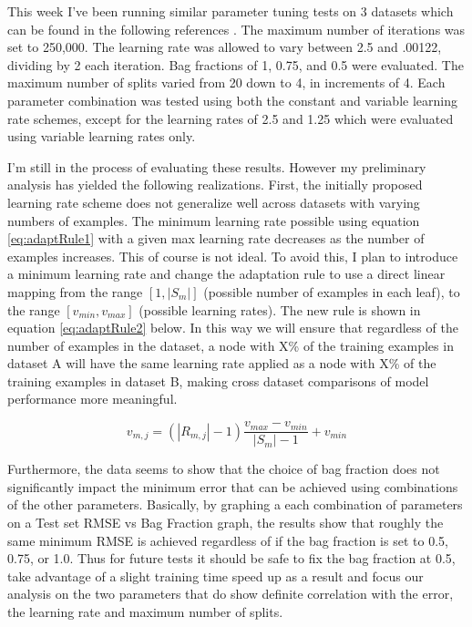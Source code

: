 \documentclass[runningheads]{llncs_2}
\begin{document}
This week I've been running similar parameter tuning tests on 3  datasets which can be found in the following references \cite{airFoilDataset} \cite{bikeSharingDataset} \cite{powerPlantDataset}. The maximum number of iterations was set to 250,000. The learning rate was allowed to vary between 2.5 and .00122, dividing by 2 each iteration. Bag fractions of 1, 0.75, and 0.5 were evaluated. The maximum number of splits varied from 20 down to 4, in increments of 4. Each parameter combination was tested using both the constant and variable learning rate schemes, except for the learning rates of 2.5 and 1.25 which were evaluated using variable learning rates only. 

I'm still in the process of evaluating these results. However my preliminary analysis has yielded the following realizations. First, the initially proposed learning rate scheme does not generalize well across datasets with varying numbers of examples. The minimum learning rate possible using equation \ref{eq:adaptRule1} with a given max learning rate decreases as the number of examples increases. This of course is not ideal. To avoid this, I plan to introduce a minimum learning rate and change the adaptation rule to use a direct linear mapping from the range $[1, |S_m|]$ (possible number of examples in each leaf), to the range $[v_{min}, v_{max}]$ (possible learning rates). The new rule is shown in equation \ref{eq:adaptRule2} below. In this way we will ensure that regardless of the number of examples in the dataset, a node with X\% of the training examples in dataset A will have the same learning rate applied as a node with X\% of the training examples in dataset B, making cross dataset comparisons of model performance more meaningful.

\begin{equation}
v_{m,j} =(|R_{m,j}| - 1)\frac{v_{max} - v_{min}} {|S_m| - 1} + v_{min}
\label{eq:adaptRule2}
\end{equation}

Furthermore, the data seems to show that the choice of bag fraction does not significantly impact the minimum error that can be achieved using combinations of the other parameters. Basically, by graphing a each combination of parameters on a Test set RMSE vs Bag Fraction graph, the results show that roughly the same minimum RMSE is achieved regardless of if the bag fraction is set to 0.5, 0.75, or 1.0. Thus for future tests it should be safe to fix the bag fraction at 0.5, take advantage of a slight training time speed up as a result and focus our analysis on the two parameters that do show definite correlation with the error, the learning rate and maximum number of splits.
\end{document}
